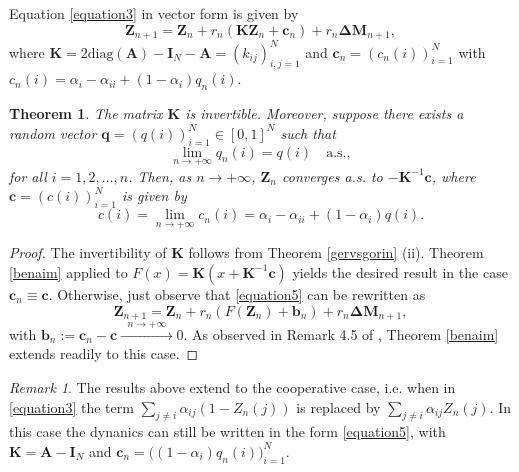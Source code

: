 \documentclass[article,12pt]{article}
\theoremstyle{plain}
\newtheorem{theorem}{Theorem}[section]
\theoremstyle{definition}
\theoremstyle{remark}
\newtheorem{remark}{Remark}
\numberwithin{equation}{section}
\numberwithin{theorem}{section}
\begin{document}
		
		Equation \eqref{equation3} in vector form is given by 
		\begin{equation}\label{equation5}
			\mathbf{Z}_{n+1}=\mathbf{Z}_n+ r_n (\mathbf{K}\mathbf{Z}_n+\mathbf{c}_n)+ r_n \mathbf{\Delta M}_{n+1},
		\end{equation}
		where $\mathbf{K}=2\mathrm{diag}(\mathbf{A})-{\mathrm{\mathbf{I}}}_{N}-\mathbf{A}=(k_{ij})_{i,j=1}^N$  
		and $\mathbf{c}_n=(c_n(i))_{i=1}^N$ with $c_n(i)=\alpha_i-\alpha_{ii}+(1-\alpha_i)q_{n}(i)$. 
		
		\begin{theorem} \label{forcing}
			The matrix $\mathbf{K}$ is invertible. Moreover, suppose there exists a random vector $\mathbf{q}=(q(i))_{i=1}^N \in [0,1]^N$ such that
			\[
			\lim_{n \rightarrow +\infty} q_n(i) = q(i)\quad  \text{a.s.},
			\]
			for all $i=1,2,\ldots,n$. Then, as $n \rightarrow +\infty$, $\mathbf{Z}_n$ converges a.s. to $-\mathbf{K}^{-1} \mathbf{c}$, where  $\mathbf{c}=(c(i))_{i=1}^N$ is given by
			\[
			c(i) = \lim_{n \rightarrow +\infty} c_n(i) = \alpha_i-\alpha_{ii}+(1-\alpha_i)q(i).
			\]
			
		\end{theorem}
		
		\begin{proof}
			The invertibility of $\mathbf{K}$ follows from Theorem \ref{gervsgorin} (ii). Theorem \ref{benaim} applied to $F(x) = \mathbf{K}(x+\mathbf{K}^{-1}\mathbf{c})$ yields the desired result in the case $\mathbf{c}_n \equiv \mathbf{c}$. Otherwise, just observe that \eqref{equation5} can be rewritten as
			\[
			\mathbf{Z}_{n+1}=\mathbf{Z}_n+ r_n (F(\mathbf{Z}_n) + \mathbf{b}_n)+r_n \mathbf{\Delta M}_{n+1},
			\]
			with $\mathbf{b}_n := \mathbf{c}_n - \mathbf{c} \xrightarrow{\text { $n \rightarrow +\infty$ }} 0$. As observed in Remark 4.5 of \cite{Benaim99}, Theorem \ref{benaim} extends readily to this case.
			
		\end{proof}
		
		\begin{remark}\label{THMQcooperative}
			The results above extend to the cooperative case, i.e. when in \eqref{equation3} the term $\sum_{j\neq i}\alpha_{ij} \left(1-Z_n(j)\right)$ is replaced by $\sum_{j\neq i}\alpha_{ij} Z_n(j)$. 
			In this case the dynanics can still be written in the form \eqref{equation5}, with $\mathbf{K}=\mathbf{A}-\mathbf{I}_N$ and  $\mathbf{c}_n=\big((1-\alpha_i)q_n(i)\big)_{i=1}^N$. 
		\end{remark} 
		
\end{document}
